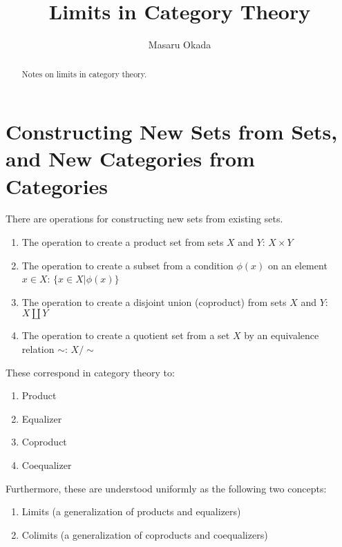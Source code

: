 \documentclass[uplatex,a4j,12pt,dvipdfmx]{jsarticle}
\title{
Limits in Category Theory
}
\author{
Masaru Okada
}
\begin{document}
\maketitle


\begin{abstract}
	Notes on limits in category theory.
\end{abstract}

\section{Constructing New Sets from Sets, and New Categories from Categories}

There are operations for constructing new sets from existing sets.

\begin{enumerate}
	\item The operation to create a product set from sets $X$ and $Y$: $X \times Y$
	\item The operation to create a subset from a condition $\phi(x)$ on an element $x \in X$: $\{ x \in X | \phi(x) \}$
	\item The operation to create a disjoint union (coproduct) from sets $X$ and $Y$: $X \coprod Y$
	\item The operation to create a quotient set from a set $X$ by an equivalence relation $\sim$: $X / \sim$
\end{enumerate}

These correspond in category theory to:

\begin{enumerate}
	\item Product
	\item Equalizer
	\item Coproduct
	\item Coequalizer
\end{enumerate}

Furthermore, these are understood uniformly as the following two concepts:

\begin{enumerate}
	\item Limits (a generalization of products and equalizers)
	\item Colimits (a generalization of coproducts and coequalizers)
\end{enumerate}
\end{document}
